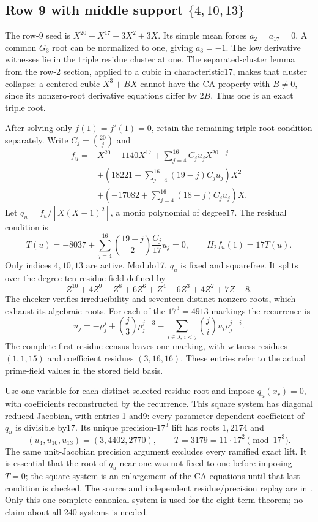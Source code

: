 \documentclass[
  british,
  10pt,
  a4paper,
]{article}
\begin{document}
\subsection{\texorpdfstring{Row 9 with middle support
\(\{4,10,13\}\)}{Row 9 with middle support \textbackslash\{4,10,13\textbackslash\}}}\label{row-9-with-middle-support-41013}

The row-9 seed is \(X^{20}-X^{17}-3X^2+3X\). Its simple mean forces
\(a_2=a_{17}=0\). A common \(G_3\) root can be normalized to one, giving
\(a_3=-1\). The low derivative witnesses lie in the triple residue
cluster at one. The separated-cluster lemma from the row-2 section,
applied to a cubic in characteristic17, makes that cluster collapse: a
centered cubic \(X^3+BX\) cannot have the CA property with \(B\ne0\),
since its nonzero-root derivative equations differ by \(2B\). Thus one
is an exact triple root.

After solving only \(f(1)=f'(1)=0\), retain the remaining triple-root
condition separately. Write \(C_j=\binom{20}{j}\) and \[
\begin{aligned}
f_u={}&X^{20}-1140X^{17}+\sum_{j=4}^{16}C_ju_jX^{20-j}\\
 &+\left(18221-\sum_{j=4}^{16}(19-j)C_ju_j\right)X^2\\
 &+\left(-17082+\sum_{j=4}^{16}(18-j)C_ju_j\right)X.
\end{aligned}
\] Let \(q_u=f_u/[X(X-1)^2]\), a monic polynomial of degree17. The
residual condition is \[
T(u)=-8037+\sum_{j=4}^{16}\binom{19-j}{2}\frac{C_j}{17}u_j=0,
\qquad H_2f_u(1)=17T(u).
\] Only indices \(4,10,13\) are active. Modulo17, \(q_u\) is fixed and
squarefree. It splits over the degree-ten residue field defined by \[
Z^{10}+4Z^9-Z^8+6Z^6+Z^4-6Z^3+4Z^2+7Z-8.
\] The checker verifies irreducibility and seventeen distinct nonzero
roots, which exhaust its algebraic roots. For each of the \(17^3=4913\)
markings the recurrence is \[
u_j=-\rho_j^j+\binom j3\rho_j^{j-3}
 -\sum_{i\in J,\,i<j}\binom ji u_i\rho_j^{j-i}.
\] The complete first-residue census leaves one marking, with witness
residues \((1,1,15)\) and coefficient residues \((3,16,16)\). These
entries refer to the actual prime-field values in the stored field
basis.

Use one variable for each distinct selected residue root and impose
\(q_u(x_r)=0\), with coefficients reconstructed by the recurrence. This
square system has diagonal reduced Jacobian, with entries 1 and9: every
parameter-dependent coefficient of \(q_u\) is divisible by17. Its unique
precision-\(17^3\) lift has roots \(1,2174\) and \[
(u_4,u_{10},u_{13})=(3,4402,2770),
\qquad T=3179=11\cdot17^2\pmod{17^3}.
\] The same unit-Jacobian precision argument excludes every ramified
exact lift. It is essential that the root of \(q_u\) near one was not
fixed to one before imposing \(T=0\); the square system is an
enlargement of the CA equations until that last condition is checked.
The source and independent residue/precision replay are in
. Only this
one complete canonical system is used for the eight-term theorem; no
claim about all 240 systems is needed.
\end{document}
